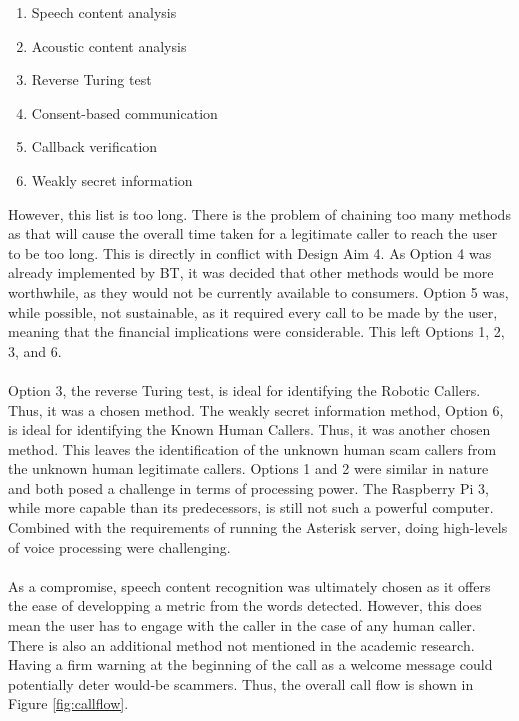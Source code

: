 \documentclass[main.tex]{subfiles}
\begin{document}
\begin{enumerate}
	\item Speech content analysis
	\item Acoustic content analysis
	\item Reverse Turing test
	\item Consent-based communication
	\item Callback verification
	\item Weakly secret information
\end{enumerate}

However, this list is too long. There is the problem of chaining too many methods as that will cause the overall time taken for a legitimate caller to reach the user to be too long. This is directly in conflict with Design Aim 4. As Option 4 was already implemented by BT, it was decided that other methods would be more worthwhile, as they would not be currently available to consumers. Option 5 was, while possible, not sustainable, as it required every call to be made by the user, meaning that the financial implications were considerable. This left Options 1, 2, 3, and 6.
\\\\
Option 3, the reverse Turing test, is ideal for identifying the Robotic Callers. Thus, it was a chosen method. The weakly secret information method, Option 6, is ideal for identifying the Known Human Callers. Thus, it was another chosen method. This leaves the identification of the unknown human scam callers from the unknown human legitimate callers. Options 1 and 2 were similar in nature and both posed a challenge in terms of processing power. The Raspberry Pi 3, while more capable than its predecessors, is still not such a powerful computer. Combined with the requirements of running the Asterisk server, doing high-levels of voice processing were challenging.
\\\\
As a compromise, speech content recognition was ultimately chosen as it offers the ease of developping a metric from the words detected. However, this does mean the user has to engage with the caller in the case of any human caller. There is also an additional method not mentioned in the academic research. Having a firm warning at the beginning of the call as a welcome message could potentially deter would-be scammers. Thus, the overall call flow is shown in Figure \ref{fig:callflow}.
\end{document}
